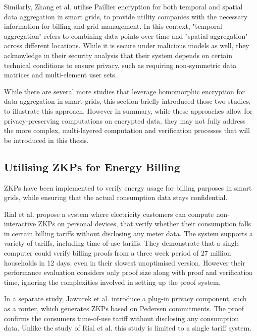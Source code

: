 Similarly, Zhang et al. \cite{homo1} utilise Paillier encryption for both temporal and spatial data aggregation in smart grids, to provide utility companies with the necessary information for billing and grid management. In this context, "temporal aggregation" refers to combining data points over time and "spatial aggregation" across different locations. While it is secure under malicious models as well, they acknowledge in their security analysis that their system depends on certain technical conditions to ensure privacy, such as requiring non-symmetric data matrices and multi-element user sets.

While there are several more studies that leverage homomorphic encryption for data aggregation in smart grids, this section briefly introduced those two studies, to illustrate this approach. However in summary, while these approaches allow for privacy-preserving computations on encrypted data, they  may not fully address the more complex, multi-layered computation and verification processes that will be introduced in this thesis.

\subsection{Utilising ZKPs for Energy Billing}

ZKPs have been implemented to verify energy usage for billing purposes in smart grids, while ensuring that the actual consumption data stays confidential.

Rial et al. \cite{rial2011privacy} propose a system where electricity customers can compute non-interactive ZKPs on personal devices, that verify whether their consumption falls in certain billing tariffs without disclosing any meter data. The system supports a variety of tariffs, including time-of-use tariffs. They demonstrate that a single computer could verify billing proofs from a three week period of 27 million households in 12 days, even in their slowest unoptimised version. However their performance evaluation considers only proof size along with proof and verification time, ignoring the complexities involved in setting up the proof system.

In a separate study, Jawurek et al.  \cite{jawurek2011plug} introduce a plug-in privacy component, such as a router, which generates ZKPs based on Pedersen commitments. The proof confirms the consumers time-of-use tariff without disclosing any consumption data. Unlike the study of Rial et al. \cite{rial2011privacy} this study is limited to a single tariff system. 

